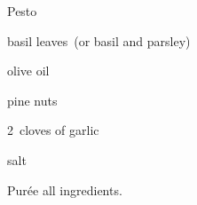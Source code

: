\begin{recipe}{Pesto}{}{}

\begin{ingredients}
\item {} basil leaves~(or basil and parsley)
\item \C{\third} olive oil
\item \C{\quarter} pine nuts
\item 2~cloves of garlic
\item salt
\end{ingredients}

\begin{directions}
\item Pur\'ee all ingredients.
\end{directions}

\end{recipe}
